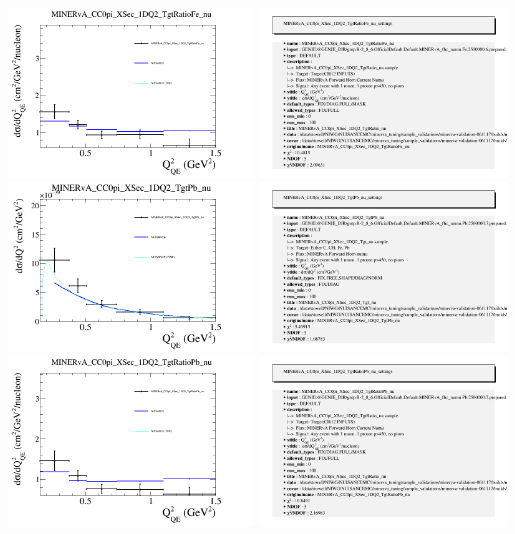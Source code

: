 \documentclass{article}
\begin{document}
\centering
\includegraphics[width=0.49\textwidth]{figures/nuisance_MINERvA_CC0pi_XSec_1DQ2_TgtRatioFe_nu_comp.png}
\includegraphics[width=0.49\textwidth]{figures/nuisance_MINERvA_CC0pi_XSec_1DQ2_TgtRatioFe_nu_info.png}
\centering
\includegraphics[width=0.49\textwidth]{figures/nuisance_MINERvA_CC0pi_XSec_1DQ2_TgtPb_nu_comp.png}
\includegraphics[width=0.49\textwidth]{figures/nuisance_MINERvA_CC0pi_XSec_1DQ2_TgtPb_nu_info.png}
\centering
\includegraphics[width=0.49\textwidth]{figures/nuisance_MINERvA_CC0pi_XSec_1DQ2_TgtRatioPb_nu_comp.png}
\includegraphics[width=0.49\textwidth]{figures/nuisance_MINERvA_CC0pi_XSec_1DQ2_TgtRatioPb_nu_info.png}
\end{document}
